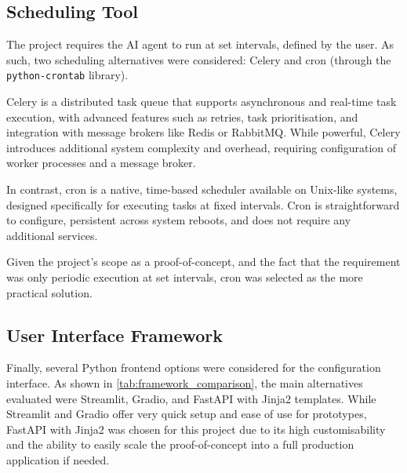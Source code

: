 \documentclass[a4paper]{report}
\begin{document}
\subsection{Scheduling Tool}

The project requires the AI agent to run at set intervals, defined by the user. As such, two scheduling alternatives were considered: Celery and cron (through the \texttt{python-crontab} library).

Celery is a distributed task queue that supports asynchronous and real-time task execution, with advanced features such as retries, task prioritisation, and integration with message brokers like Redis or RabbitMQ. While powerful, Celery introduces additional system complexity and overhead, requiring configuration of worker processes and a message broker.

In contrast, cron is a native, time-based scheduler available on Unix-like systems, designed specifically for executing tasks at fixed intervals. Cron is straightforward to configure, persistent across system reboots, and does not require any additional services.

Given the project's scope as a proof-of-concept, and the fact that the requirement was only periodic execution at set intervals, cron was selected as the more practical solution.

\subsection{User Interface Framework}

Finally, several Python frontend options were considered for the configuration interface. As shown in \autoref{tab:framework_comparison}, the main alternatives evaluated were Streamlit, Gradio, and FastAPI with Jinja2 templates. While Streamlit and Gradio offer very quick setup and ease of use for prototypes, FastAPI with Jinja2 was chosen for this project due to its high customisability and the ability to easily scale the proof-of-concept into a full production application if needed.
\end{document}
